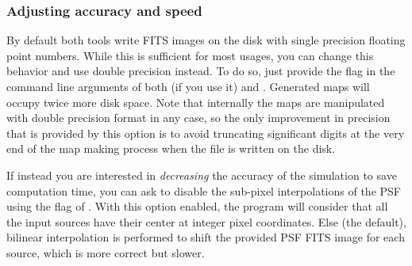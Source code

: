 \subsubsection{Adjusting accuracy and speed}

By default both tools write FITS images on the disk with single precision floating point numbers. While this is sufficient for most usages, you can change this behavior and use double precision instead. To do so, just provide the  flag in the command line arguments of both  (if you use it) and . Generated maps will occupy twice more disk space. Note that internally the maps are manipulated with double precision format in any case, so the only improvement in precision that is provided by this option is to avoid truncating significant digits at the very end of the map making process when the file is written on the disk.

If instead you are interested in \emph{decreasing} the accuracy of the simulation to save computation time, you can ask to disable the sub-pixel interpolations of the PSF using the  flag of . With this option enabled, the program will consider that all the input sources have their center at integer pixel coordinates. Else (the default), bilinear interpolation is performed to shift the provided PSF FITS image for each source, which is more correct but slower.
